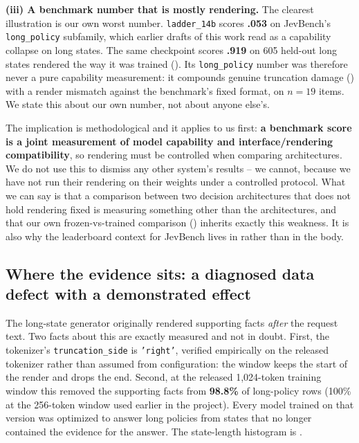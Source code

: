\textbf{(iii) A benchmark number that is mostly rendering.} The clearest illustration is our own worst
number. \texttt{ladder\_14b} scores \textbf{.053} on JevBench's \texttt{long\_policy} subfamily, which
earlier drafts of this work read as a capability collapse on long states. The same checkpoint scores
\textbf{.919} on 605 held-out long states rendered the way it was trained (). Its
\texttt{long\_policy} number was therefore never a pure capability measurement: it compounds genuine
truncation damage () with a render mismatch against the benchmark's fixed
format, on $n{=}19$ items. We state this about our own number, not about anyone else's.

The implication is methodological and it applies to us first: \textbf{a benchmark score is a joint
measurement of model capability and interface/rendering compatibility}, so rendering must be controlled
when comparing architectures. We do not use this to dismiss any other system's results -- we cannot,
because we have not run their rendering on their weights under a controlled protocol. What we can say is
that a comparison between two decision architectures that does not hold rendering fixed is measuring
something other than the architectures, and that our own frozen-vs-trained comparison
() inherits exactly this weakness. It is also why the leaderboard context for
JevBench lives in  rather than in the body.

\subsection{Where the evidence sits: a diagnosed data defect with a demonstrated effect}
\label{sec:boundary:truncation}

The long-state generator originally rendered supporting facts \emph{after} the request text. Two facts
about this are exactly measured and not in doubt. First, the tokenizer's \texttt{truncation\_side} is
\texttt{'right'}, verified empirically on the released tokenizer rather than assumed from
configuration: the window keeps the start of the render and drops the end. Second, at the released
1{,}024-token training window this removed the supporting facts from \textbf{98.8\%} of long-policy rows
(100\% at the 256-token window used earlier in the project). Every model trained on that version was
optimized to answer long policies from states that no longer contained the evidence for the answer. The
state-length histogram is .

